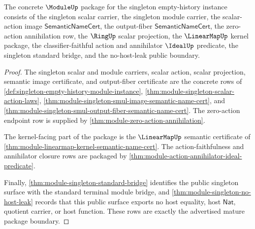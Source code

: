 \begin{theorem}
\label{thm:module-mature-package-boundary}
The concrete $\ModuleUp$ package for the singleton empty-history instance consists of the singleton scalar carrier, the singleton module carrier, the scalar-action image $\mathsf{SemanticNameCert}$, the output-fiber $\mathsf{SemanticNameCert}$, the zero-action annihilation row, the $\RingUp$ scalar projection, the $\LinearMapUp$ kernel package, the classifier-faithful action and annihilator $\IdealUp$ predicate, the singleton standard bridge, and the no-host-leak public boundary.
\end{theorem}
\begin{proof}
The singleton scalar and module carriers, scalar action, scalar projection, semantic image certificate, and output-fiber certificate are the concrete rows of \autoref{def:singleton-empty-history-module-instance}, \autoref{thm:module-singleton-scalar-action-laws}, \autoref{thm:module-singleton-smul-image-semantic-name-cert}, and \autoref{thm:module-singleton-smul-output-fiber-semantic-name-cert}. The zero-action endpoint row is supplied by \autoref{thm:module-zero-action-annihilation}.

The kernel-facing part of the package is the $\LinearMapUp$ semantic certificate of \autoref{thm:module-linearmap-kernel-semantic-name-cert}. The action-faithfulness and annihilator closure rows are packaged by \autoref{thm:module-action-annihilator-ideal-predicate}.

Finally, \autoref{thm:module-singleton-standard-bridge} identifies the public singleton surface with the standard terminal module bridge, and \autoref{thm:module-singleton-no-host-leak} records that this public surface exports no host equality, host $\mathsf{Nat}$, quotient carrier, or host function. These rows are exactly the advertised mature package boundary.
\end{proof}

